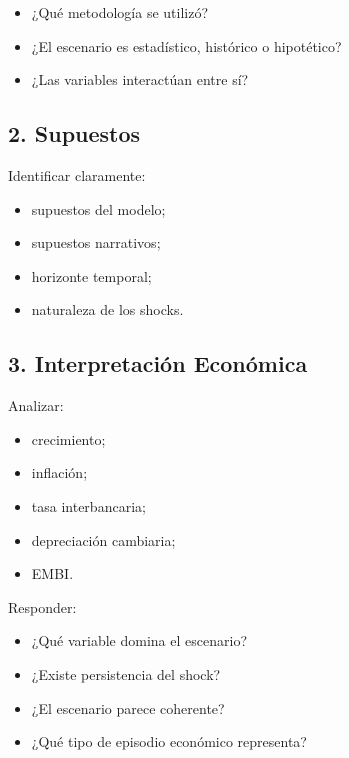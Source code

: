 \documentclass[12pt]{article}
\begin{document}
\begin{itemize}
    \item ¿Qué metodología se utilizó?
    \item ¿El escenario es estadístico, histórico o hipotético?
    \item ¿Las variables interactúan entre sí?
\end{itemize}

\subsection*{2. Supuestos}

Identificar claramente:

\begin{itemize}
    \item supuestos del modelo;
    \item supuestos narrativos;
    \item horizonte temporal;
    \item naturaleza de los shocks.
\end{itemize}

\subsection*{3. Interpretación Económica}

Analizar:

\begin{itemize}
    \item crecimiento;
    \item inflación;
    \item tasa interbancaria;
    \item depreciación cambiaria;
    \item EMBI.
\end{itemize}

Responder:

\begin{itemize}
    \item ¿Qué variable domina el escenario?
    \item ¿Existe persistencia del shock?
    \item ¿El escenario parece coherente?
    \item ¿Qué tipo de episodio económico representa?
\end{itemize}

\vspace{0.5cm}

\end{document}
